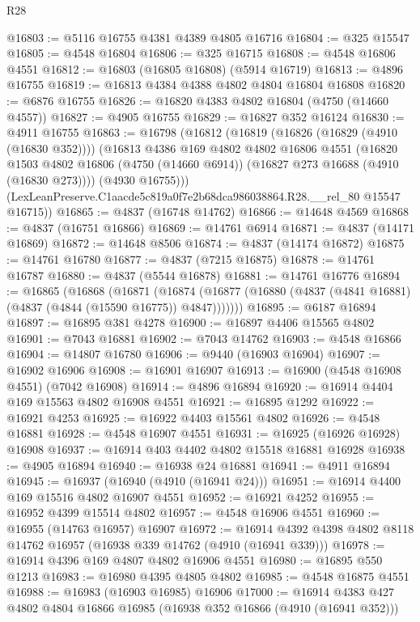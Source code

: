\begin{lexlean}{R28}
\begin{coremodule}
@16803 := @5116 @16755 @4381 @4389 @4805 @16716
@16804 := @325 @15547
@16805 := @4548 @16804
@16806 := @325 @16715
@16808 := @4548 @16806 @4551
@16812 := @16803 (@16805 @16808) (@5914 @16719)
@16813 := @4896 @16755
@16819 := @16813 @4384 @4388 @4802 @4804 @16804 @16808
@16820 := @6876 @16755
@16826 := @16820 @4383 @4802 @16804 (@4750 (@14660 @4557))
@16827 := @4905 @16755
@16829 := @16827 @352 @16124
@16830 := @4911 @16755
@16863 := @16798
    (@16812
      (@16819
        (@16826 (@16829 (@4910 (@16830 @352))))
        (@16813
          @4386
          @169
          @4802
          @4802
          @16806
          @4551
          (@16820
            @1503
            @4802
            @16806
            (@4750 (@14660 @6914))
            (@16827 @273 @16688 (@4910 (@16830 @273))))
          (@4930 @16755)))
      (LexLeanPreserve.C1aacde5c819a0f7e2b68dca986038864.R28.__rel_80 @15547 @16715))
@16865 := @4837 (@16748 @14762)
@16866 := @14648 @4569
@16868 := @4837 (@16751 @16866)
@16869 := @14761 @6914
@16871 := @4837 (@14171 @16869)
@16872 := @14648 @8506
@16874 := @4837 (@14174 @16872)
@16875 := @14761 @16780
@16877 := @4837 (@7215 @16875)
@16878 := @14761 @16787
@16880 := @4837 (@5544 @16878)
@16881 := @14761 @16776
@16894 := @16865
    (@16868
      (@16871
        (@16874 (@16877 (@16880 (@4837 (@4841 @16881) (@4837 (@4844 (@15590 @16775)) @4847)))))))
@16895 := @6187 @16894
@16897 := @16895 @381 @4278
@16900 := @16897 @4406 @15565 @4802
@16901 := @7043 @16881
@16902 := @7043 @14762
@16903 := @4548 @16866
@16904 := @14807 @16780
@16906 := @9440 (@16903 @16904)
@16907 := @16902 @16906
@16908 := @16901 @16907
@16913 := @16900 (@4548 @16908 @4551) (@7042 @16908)
@16914 := @4896 @16894
@16920 := @16914 @4404 @169 @15563 @4802 @16908 @4551
@16921 := @16895 @1292
@16922 := @16921 @4253
@16925 := @16922 @4403 @15561 @4802
@16926 := @4548 @16881
@16928 := @4548 @16907 @4551
@16931 := @16925 (@16926 @16928) @16908
@16937 := @16914 @403 @4402 @4802 @15518 @16881 @16928
@16938 := @4905 @16894
@16940 := @16938 @24 @16881
@16941 := @4911 @16894
@16945 := @16937 (@16940 (@4910 (@16941 @24)))
@16951 := @16914 @4400 @169 @15516 @4802 @16907 @4551
@16952 := @16921 @4252
@16955 := @16952 @4399 @15514 @4802
@16957 := @4548 @16906 @4551
@16960 := @16955 (@14763 @16957) @16907
@16972 := @16914 @4392 @4398 @4802 @8118 @14762 @16957 (@16938 @339 @14762 (@4910 (@16941 @339)))
@16978 := @16914 @4396 @169 @4807 @4802 @16906 @4551
@16980 := @16895 @550 @1213
@16983 := @16980 @4395 @4805 @4802
@16985 := @4548 @16875 @4551
@16988 := @16983 (@16903 @16985) @16906
@17000 := @16914 @4383 @427 @4802 @4804 @16866 @16985 (@16938 @352 @16866 (@4910 (@16941 @352)))

\end{coremodule}
\end{lexlean}
